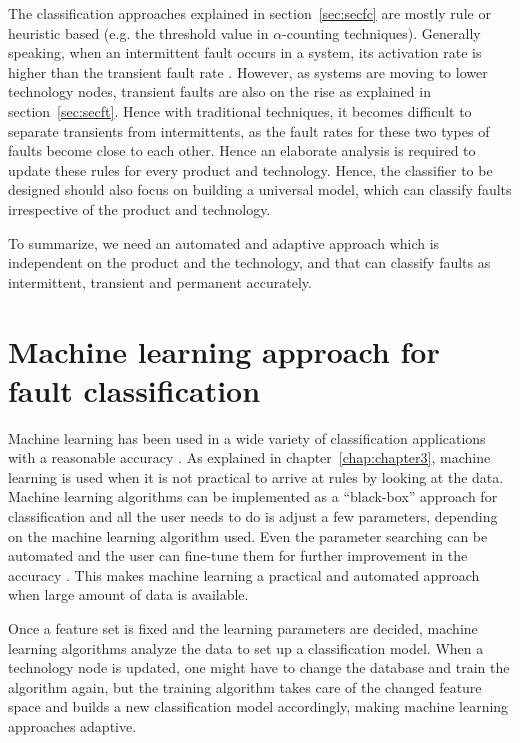 The classification approaches explained in section~\ref{sec:secfc} are mostly rule or heuristic based (e.g. the threshold value in $\alpha$-counting techniques). Generally speaking, when an intermittent fault occurs in a system, its activation rate is higher than the transient fault rate \cite{Bondavalli2000}. However, as systems are moving to lower technology nodes, transient faults are also on the rise as explained in section~\ref{sec:secft}. Hence with traditional techniques, it becomes difficult to separate transients from intermittents, as the fault rates for these two types of faults become close to each other. Hence an elaborate analysis is required to update these rules for every product and technology. Hence, the classifier to be designed should also focus on building a universal model, which can classify faults irrespective of the product and technology.

To summarize, we need an automated and adaptive approach which is independent on the product and the technology, and that can classify faults as intermittent, transient and permanent accurately. 

\section{Machine learning approach for fault classification}

Machine learning has been used in a wide variety of classification applications with a reasonable accuracy \cite{Pang2002,Nguyen2008,Sebastiani2002, Kotsiantis2007}. As explained in chapter~\ref{chap:chapter3}, machine learning is used when it is not practical to arrive at rules by looking at the data. Machine learning algorithms can be implemented as a \enquote{black-box} approach for classification and all the user needs to do is adjust a few parameters, depending on the machine learning algorithm used. Even the parameter searching can be automated and the user can fine-tune them for further improvement in the accuracy \cite{Hsu2003, Castillo2000}. This makes machine learning a practical and automated approach when large amount of data is available.

Once a feature set is fixed and the learning parameters are decided, machine learning algorithms analyze the data to set up a classification model. When a technology node is updated, one might have to change the database and train the algorithm again, but the training algorithm takes care of the changed feature space and builds a new classification model accordingly, making machine learning approaches adaptive.

